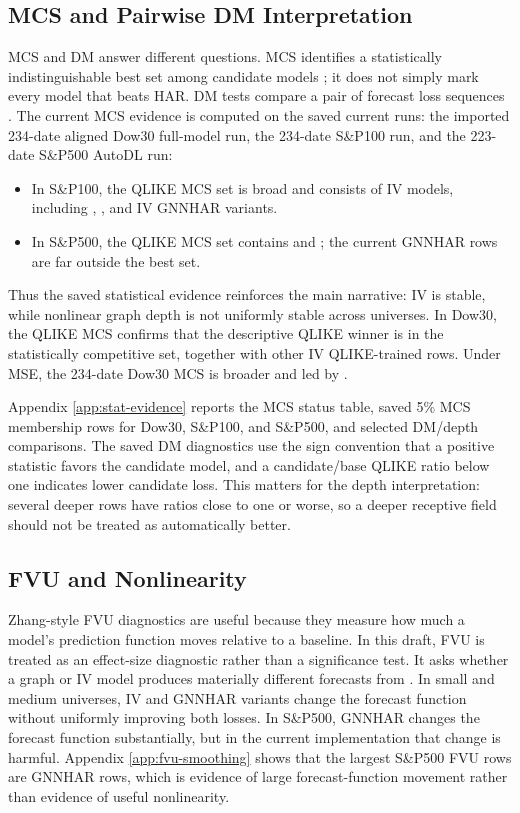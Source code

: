 \documentclass[11pt,a4paper]{article}
\newcommand{\model}[1]{\texttt{\detokenize{#1}}}
\begin{document}
\subsection{MCS and Pairwise DM Interpretation}
\label{subsec:mcs-dm}

MCS and DM answer different questions.  MCS identifies a statistically indistinguishable best set among candidate models \citep{hansen2011mcs}; it does not simply mark every model that beats HAR.  DM tests compare a pair of forecast loss sequences \citep{diebold1995dm}.  The current MCS evidence is computed on the saved current runs: the imported 234-date aligned Dow30 full-model run, the 234-date S\&P100 run, and the 223-date S\&P500 AutoDL run:
\begin{itemize}
  \item In S\&P100, the QLIKE MCS set is broad and consists of IV models, including \model{HAR_Q_IV}, \model{GHAR_Q_IV}, and IV GNNHAR variants.
  \item In S\&P500, the QLIKE MCS set contains \model{GHAR_M_IV} and \model{HAR_M_IV}; the current GNNHAR rows are far outside the best set.
\end{itemize}
Thus the saved statistical evidence reinforces the main narrative: IV is stable, while nonlinear graph depth is not uniformly stable across universes.  In Dow30, the QLIKE MCS confirms that the descriptive QLIKE winner \model{GNNHAR2L_Q_IV} is in the statistically competitive set, together with other IV QLIKE-trained rows.  Under MSE, the 234-date Dow30 MCS is broader and led by \model{HAR_M_IV}.

Appendix \ref{app:stat-evidence} reports the MCS status table, saved 5\% MCS membership rows for Dow30, S\&P100, and S\&P500, and selected DM/depth comparisons.  The saved DM diagnostics use the sign convention that a positive statistic favors the candidate model, and a candidate/base QLIKE ratio below one indicates lower candidate loss.  This matters for the depth interpretation: several deeper rows have ratios close to one or worse, so a deeper receptive field should not be treated as automatically better.

\subsection{FVU and Nonlinearity}
\label{subsec:fvu}

Zhang-style FVU diagnostics are useful because they measure how much a model's prediction function moves relative to a baseline.  In this draft, FVU is treated as an effect-size diagnostic rather than a significance test.  It asks whether a graph or IV model produces materially different forecasts from \model{HAR_M}.  In small and medium universes, IV and GNNHAR variants change the forecast function without uniformly improving both losses.  In S\&P500, GNNHAR changes the forecast function substantially, but in the current implementation that change is harmful.  Appendix \ref{app:fvu-smoothing} shows that the largest S\&P500 FVU rows are GNNHAR rows, which is evidence of large forecast-function movement rather than evidence of useful nonlinearity.
\end{document}
